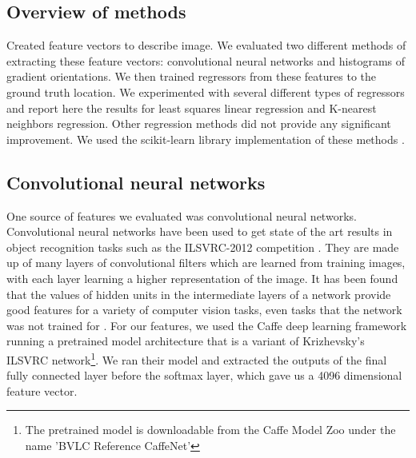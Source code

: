 \documentclass[10pt,twocolumn,letterpaper]{article}
\begin{document}
\subsection{Overview of methods}

Created feature vectors to describe image.  We evaluated two different methods of extracting these feature vectors: convolutional neural networks and histograms of gradient orientations.  We then trained regressors from these features to the ground truth location.  We experimented with several different types of regressors and report here the results for least squares linear regression and K-nearest neighbors regression.  Other regression methods did not provide any significant improvement.  We used the scikit-learn library implementation of these methods \cite{scikit-learn}.

\subsection{Convolutional neural networks}

One source of features we evaluated was convolutional neural networks.  Convolutional neural networks have been used to get state of the art results in object recognition tasks such as the ILSVRC-2012 competition \cite{krizhevsky2012imagenet}.  They are made up of many layers of convolutional filters which are learned from training images, with each layer learning a higher representation of the image.   It has been found that the values of hidden units in the intermediate layers of a network provide good features for a variety of computer vision tasks, even tasks that the network was not trained for \cite{donahue2013decaf}.  For our features, we used the Caffe deep learning framework\cite{jia2014caffe} running a pretrained model architecture that is a variant of Krizhevsky's ILSVRC network\cite{krizhevsky2012imagenet}\footnote{The pretrained model is downloadable from the Caffe Model Zoo under the name 'BVLC Reference CaffeNet'}.  We ran their model and extracted the outputs of the final fully connected layer before the softmax layer, which gave us a 4096 dimensional feature vector.
\end{document}
